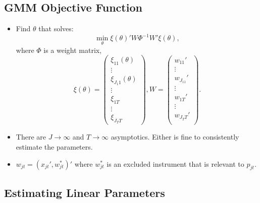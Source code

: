 \documentclass[
]{book}
\providecommand{\tightlist}{%
  \setlength{\itemsep}{0pt}\setlength{\parskip}{0pt}}
\begin{document}
\hypertarget{gmm-objective-function}{%
\subsection{GMM Objective Function}\label{gmm-objective-function}}

\begin{itemize}
\tightlist
\item
  Find \(\theta\) that solves:
  \begin{equation}
  \min_{\theta} \xi(\theta)' W \Phi^{-1} W' \xi(\theta),
  \end{equation}
  where \(\Phi\) is a weight matrix,
  \begin{equation}
  \xi(\theta) = 
  \begin{pmatrix}
  \xi_{11}(\theta)\\
  \vdots\\
  \xi_{J_1 1}(\theta)\\
  \vdots\\
  \xi_{1T} \\
  \vdots\\
  \xi_{J_T T}
  \end{pmatrix},
  W = 
  \begin{pmatrix}
  w_{11}' \\
  \vdots \\
  w_{J_11}' \\
  \vdots \\
  w_{1T}' \\
  \vdots \\
  w_{J_TT}' \\
  \end{pmatrix}.
  \end{equation}
\item
  There are \(J \to \infty\) and \(T \to \infty\) asymptotics. Either is fine to consistently estimate the parameters.
\item
  \(w_{jt} = (x_{jt}', w_{jt}^*)'\) where \(w_{jt}^*\) is an excluded instrument that is relevant to \(p_{jt}\).
\end{itemize}

\hypertarget{estimating-linear-parameters}{%
\subsection{Estimating Linear Parameters}\label{estimating-linear-parameters}}
\end{document}
